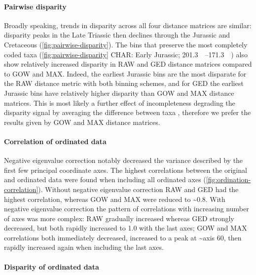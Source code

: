 \documentclass[british,a4paper]{article}
\newcommand\pcref[1]{(\cref{#1})}
\begin{document}
\paragraph{Pairwise disparity}\label{par:pairwise-disparity}

Broadly speaking, trends in disparity across all four distance matrices are
similar: disparity peaks in the Late Triassic then declines through the Jurassic
and Cretaceous \pcref{fig:pairwise-disparity}. The bins that preserve the most
completely coded taxa (\cref{fig:pairwise-disparity} CHAR\@: Early Jurassic;
\SIrange{201.3}{171.3}{\mega\annum}) also show relatively increased disparity in
RAW and GED distance matrices compared to GOW and MAX\@. Indeed, the earliest
Jurassic bins are the most disparate for the RAW distance metric with both
binning schemes, and for GED the earliest Jurassic bins have relatively higher
disparity than GOW and MAX distance matrices. This is most likely a further
effect of incompleteness degrading the disparity signal by averaging the
difference between taxa \autocite{FlannerySutherland2019PRSBBS, Lehmann2019P},
therefore we prefer the results given by GOW and MAX distance matrices.

\paragraph{Correlation of ordinated data}\label{par:pco-correlation}

Negative eigenvalue correction notably decreased the variance described by the
first few principal coordinate axes. The highest correlations between the
original and ordinated data were found when including all ordinated axes
\pcref{fig:ordination-correlation}. Without negative eigenvalue correction RAW
and GED had the highest correlation, whereas GOW and MAX were reduced to
\textasciitilde{}0.8. With negative eigenvalue correction the pattern of
correlations with increasing number of axes was more complex: RAW gradually
increased whereas GED strongly decreased, but both rapidly increased to 1.0 with
the last axes; GOW and MAX correlations both immediately decreased, increased to
a peak at \textasciitilde{}axis 60, then rapidly increased again when including
the last axes.

\paragraph{Disparity of ordinated data}\label{par:ordinated-disparity}
\end{document}
